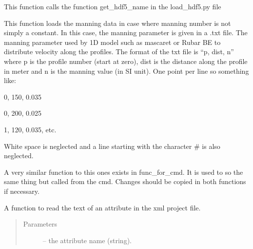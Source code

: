 \documentclass[letterpaper,10pt,english]{sphinxmanual}
\begin{document}
\begin{fulllineitems}
\begin{fulllineitems}
This function calls the function get\_hdf5\_name in the load\_hdf5.py file

\end{fulllineitems}


\begin{fulllineitems}
\label{\detokenize{index:src_GUI.hydro_GUI_2.SubHydroW.load_manning_text}}
This function loads the manning data in case where manning number is not simply a constant. In this case, the manning
parameter is given in a .txt file.
The manning parameter used by 1D model such as mascaret or Rubar BE to distribute velocity along the profiles.
The format of the txt file is ``p, dist, n'' where  p is the profile number (start at zero), dist is the distance
along the profile in meter and n is the manning value (in SI unit). One point per line so something like:

0, 150, 0.035

0, 200, 0.025

1, 120, 0.035, etc.

White space is neglected and a line starting with the character \# is also neglected.

A very similar function to this ones exists in func\_for\_cmd. It is used to so the same thing but called
from the cmd. Changes should be copied in both functions if necessary.

\end{fulllineitems}


\begin{fulllineitems}
\label{\detokenize{index:src_GUI.hydro_GUI_2.SubHydroW.read_attribute_xml}}
A function to read the text of an attribute in the xml project file.
\begin{quote}\begin{description}
\item[{Parameters}] \leavevmode
{} -- the attribute name (string).

\end{description}\end{quote}

\end{fulllineitems}


\end{fulllineitems}
\end{document}
